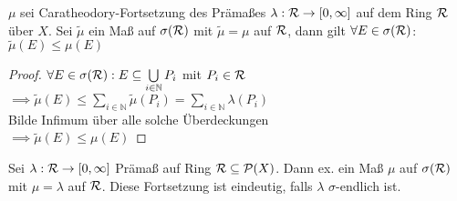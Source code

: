   \newpage

  \begin{lemma}[Im Aufschrieb II.13]
    $\mu$ sei Caratheodory-Fortsetzung des Prämaßes $\lambda: \mathcal{R} \to [0, \infty]$ auf dem Ring $\mathcal{R}$ über $X$. Sei $\tilde{\mu}$ ein Maß auf $\sigma(\mathcal{R})$ mit $\tilde{\mu} = \mu$ auf $\mathcal{R}$, dann gilt $\forall E \in \sigma(\mathcal{R})$:\\
    $\tilde{\mu}(E) \leq \mu(E)$
  \end{lemma}

  \begin{proof}
    $\forall E \in \sigma(\mathcal{R}): E \subseteq \bigcup\limits_{i \in \mathbb{N}} P_i$ mit $P_i \in \mathcal{R}$\\
    $\implies \tilde{\mu}(E) \leq \sum\limits_{i \in \mathbb{N}} \tilde{\mu}(P_i) = \sum\limits_{i \in \mathbb{N}} \lambda(P_i)$\\
    Bilde Infimum über alle solche Überdeckungen\\
    $\implies \tilde{\mu}(E) \leq \mu(E)$ 
  \end{proof}


  \begin{theorem}[Im Aufschrieb II.14]
    Sei $\lambda: \mathcal{R} \to [0, \infty]$ Prämaß auf Ring $\mathcal{R}\subseteq \mathcal{P}(X)$. Dann ex. ein Maß $\mu$ auf $\sigma(\mathcal{R})$ mit $\mu=\lambda$ auf $\mathcal{R}$. Diese Fortsetzung ist eindeutig, falls $\lambda$ $\sigma$-endlich ist.
  \end{theorem}


